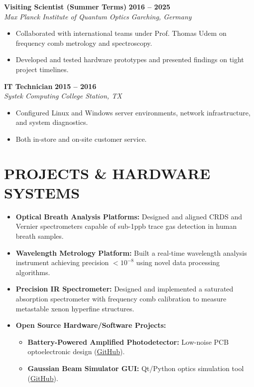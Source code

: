 \documentclass[a4paper,10pt]{extarticle}
\newcommand{\resumeentry}[4]{
	\noindent\textbf{#2} \hfill \textbf{#1}\\
	\textit{#3} \hfill \textit{#4}\\[0.2em]
}
\begin{document}
	\vspace{0.3em}
	\resumeentry{2016 -- 2025}{Visiting Scientist (Summer Terms)}{Max Planck Institute of Quantum Optics}{Garching, Germany}
	\begin{itemize}[leftmargin=1.2em, itemsep=0.2em]
		\item Collaborated with international teams under Prof. Thomas Udem on frequency comb metrology and spectroscopy.
		\item Developed and tested hardware prototypes and presented findings on tight project timelines.
	\end{itemize}
	
	\vspace{0.3em}
	\resumeentry{2015 -- 2016}{IT Technician}{Systek Computing}{College Station, TX}
	\begin{itemize}[leftmargin=1.2em, itemsep=0.2em]
		\item Configured Linux and Windows server environments, network infrastructure, and system diagnostics.
		\item Both in-store and on-site customer service.
	\end{itemize}
	
	\section*{PROJECTS \& HARDWARE SYSTEMS}
	\begin{itemize}[leftmargin=1.2em, itemsep=0.3em]
		\item \textbf{Optical Breath Analysis Platforms:} Designed and aligned CRDS and Vernier spectrometers capable of sub-1ppb trace gas detection in human breath samples.
		\item \textbf{Wavelength Metrology Platform:} Built a real-time wavelength analysis instrument achieving precision $< 10^{-8}$ using novel data processing algorithms.
		\item \textbf{Precision IR Spectrometer:} Designed and implemented a saturated absorption spectrometer with frequency comb calibration to measure metastable xenon hyperfine structures.
		\item \textbf{Open Source Hardware/Software Projects:} 
		\begin{itemize}[leftmargin=1em, itemsep=0.1em]
			\item \textbf{Battery-Powered Amplified Photodetector:} Low-noise PCB optoelectronic design (\href{https://github.com/jaymz07/Photodetector-Battery}{GitHub}).
			\item \textbf{Gaussian Beam Simulator GUI:} Qt/Python optics simulation tool (\href{https://github.com/jaymz07/Gaussian-Beam-Sim-Qt}{GitHub}).
		\end{itemize}
	\end{itemize}
	
\end{document}
